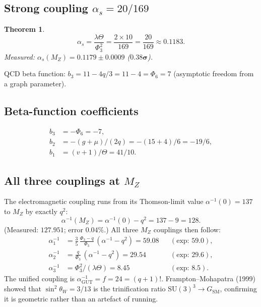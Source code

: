 \documentclass[12pt,a4paper]{article}
\newtheorem{theorem}{Theorem}[section]
\theoremstyle{definition}
\newcommand{\SU}{\mathrm{SU}}
\newcommand{\Phithree}{\Phi_3}
\newcommand{\Phisix}{\Phi_6}
\begin{document}
\subsection{Strong coupling \texorpdfstring{$\alpha_s=20/169$}{alpha_s=20/169}}

\begin{theorem}
\begin{equation}
  \label{eq:alphas}
  \boxed{\alpha_s = \frac{\lambda\Theta}{\Phithree^2}
       = \frac{2\times 10}{169} = \frac{20}{169} \approx 0.1183.}
\end{equation}
Measured: $\alpha_s(M_Z)=0.1179\pm 0.0009$ ($\mathbf{0.38\sigma}$).
\end{theorem}

QCD beta function: $b_3=11-4q/3=11-4=\Phisix=7$ (asymptotic freedom
from a graph parameter).

\subsection{Beta-function coefficients}

\begin{align}
  b_3 &= -\Phisix = -7, \\
  b_2 &= -(g+\mu)/(2q) = -(15+4)/6 = -19/6, \\
  b_1 &= (v+1)/\Theta = 41/10.
\end{align}

\subsection{All three couplings at \texorpdfstring{$M_Z$}{MZ}}

The electromagnetic coupling runs from its Thomson-limit value
$\alpha^{-1}(0)=137$ to $M_Z$ by exactly $q^2$:
\begin{equation}
  \alpha^{-1}(M_Z) = \alpha^{-1}(0) - q^2 = 137-9 = 128.
\end{equation}
(Measured: $127.951$; error $0.04\%$.)
All three $M_Z$ couplings then follow:
\begin{align}
  \alpha_1^{-1} &= \tfrac{3}{5}\,\tfrac{\Phithree-q}{\Phithree}\,(\alpha^{-1}{-}q^2)
    = 59.08 &&(\text{exp: }59.0),\\
  \alpha_2^{-1} &= \tfrac{q}{\Phithree}\,(\alpha^{-1}{-}q^2) = 29.54
    &&(\text{exp: }29.6),\\
  \alpha_3^{-1} &= \Phithree^2/(\lambda\Theta) = 8.45
    &&(\text{exp: }8.5).
\end{align}
The unified coupling is $\alpha_{\text{GUT}}^{-1}=f=24=(q+1)!$.
Frampton--Mohapatra (1999) showed that $\sin^2\theta_W=3/13$ is the
trinification ratio $\SU(3)^3\to G_{\mathrm{SM}}$, confirming
it is geometric rather than an artefact of running.
\end{document}
